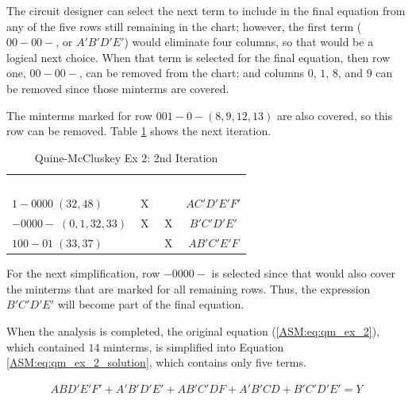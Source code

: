 The circuit designer can select the next term to include in the final equation from any of the five rows still remaining in the chart; however, the first term ($ 00-00- $, or $ A'B'D'E' $) would eliminate four columns, so that would be a logical next choice. When that term is selected for the final equation, then row one, $ 00-00- $, can be removed from the chart; and columns $ 0 $, $ 1 $, $ 8 $, and $ 9 $ can be removed since those minterms are covered. 

The minterms marked for row $ 001-0- (8,9,12,13) $ are also covered, so this row can be removed. Table \ref{ASM:tab:qm_ex_2_2nd_iteration} shows the next iteration.

\begin{table}[H]
	\sffamily
	\newcommand{\head}[1]{\textcolor{white}{\textbf{#1}}}		
	\begin{center}
		\begin{adjustbox}{max width=\textwidth}
			\begin{tabular}{lccc} 
				\rowcolor{black!75}
				& \head{32} & \head{33} & \\
				$ 1-0000\;(32,48) $       & X &   & $ AC'D'E'F' $ \\
				$ -0000-\;(0,1,32,33) $   & X & X & $ B'C'D'E' $ \\
				$ 100-01\;(33,37) $       &   & X & $ AB'C'E'F $ \\
				\hline
			\end{tabular}
		\end{adjustbox}
	\end{center}
	\caption{Quine-McCluskey Ex 2: 2nd Iteration}
  \label{ASM:tab:qm_ex_2_2nd_iteration}
\end{table}

For the next simplification, row $ -0000- $ is selected since that would also cover the minterms that are marked for all remaining rows. Thus, the expression $ B'C'D'E' $ will become part of the final equation. 

When the analysis is completed, the original equation (\ref{ASM:eq:qm_ex_2}), which contained $ 14 $ minterms, is simplified into Equation \ref{ASM:eq:qm_ex_2_solution}, which contains only five terms.

\begin{align}
	\label{ASM:eq:qm_ex_2_solution}
	ABD'E'F'+A'B'D'E'+AB'C'DF+A'B'CD+B'C'D'E' = Y 
\end{align}

